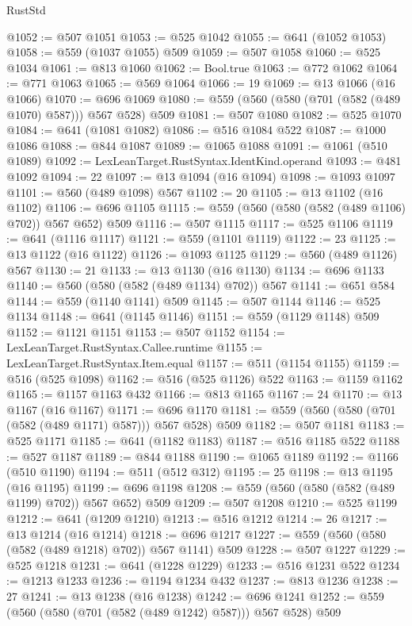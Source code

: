 \begin{lexlean}{RustStd}
\begin{coremodule}
@1052 := @507 @1051
@1053 := @525 @1042
@1055 := @641 (@1052 @1053)
@1058 := @559 (@1037 @1055) @509
@1059 := @507 @1058
@1060 := @525 @1034
@1061 := @813 @1060
@1062 := Bool.true
@1063 := @772 @1062
@1064 := @771 @1063
@1065 := @569 @1064
@1066 := 19
@1069 := @13 @1066 (@16 @1066)
@1070 := @696 @1069
@1080 := @559 (@560 (@580 (@701 (@582 (@489 @1070) @587))) @567 @528) @509
@1081 := @507 @1080
@1082 := @525 @1070
@1084 := @641 (@1081 @1082)
@1086 := @516 @1084 @522
@1087 := @1000 @1086
@1088 := @844 @1087
@1089 := @1065 @1088
@1091 := @1061 (@510 @1089)
@1092 := LexLeanTarget.RustSyntax.IdentKind.operand
@1093 := @481 @1092
@1094 := 22
@1097 := @13 @1094 (@16 @1094)
@1098 := @1093 @1097
@1101 := @560 (@489 @1098) @567
@1102 := 20
@1105 := @13 @1102 (@16 @1102)
@1106 := @696 @1105
@1115 := @559 (@560 (@580 (@582 (@489 @1106) @702)) @567 @652) @509
@1116 := @507 @1115
@1117 := @525 @1106
@1119 := @641 (@1116 @1117)
@1121 := @559 (@1101 @1119)
@1122 := 23
@1125 := @13 @1122 (@16 @1122)
@1126 := @1093 @1125
@1129 := @560 (@489 @1126) @567
@1130 := 21
@1133 := @13 @1130 (@16 @1130)
@1134 := @696 @1133
@1140 := @560 (@580 (@582 (@489 @1134) @702)) @567
@1141 := @651 @584
@1144 := @559 (@1140 @1141) @509
@1145 := @507 @1144
@1146 := @525 @1134
@1148 := @641 (@1145 @1146)
@1151 := @559 (@1129 @1148) @509
@1152 := @1121 @1151
@1153 := @507 @1152
@1154 := LexLeanTarget.RustSyntax.Callee.runtime
@1155 := LexLeanTarget.RustSyntax.Item.equal
@1157 := @511 (@1154 @1155)
@1159 := @516 (@525 @1098)
@1162 := @516 (@525 @1126) @522
@1163 := @1159 @1162
@1165 := @1157 @1163 @432
@1166 := @813 @1165
@1167 := 24
@1170 := @13 @1167 (@16 @1167)
@1171 := @696 @1170
@1181 := @559 (@560 (@580 (@701 (@582 (@489 @1171) @587))) @567 @528) @509
@1182 := @507 @1181
@1183 := @525 @1171
@1185 := @641 (@1182 @1183)
@1187 := @516 @1185 @522
@1188 := @527 @1187
@1189 := @844 @1188
@1190 := @1065 @1189
@1192 := @1166 (@510 @1190)
@1194 := @511 (@512 @312)
@1195 := 25
@1198 := @13 @1195 (@16 @1195)
@1199 := @696 @1198
@1208 := @559 (@560 (@580 (@582 (@489 @1199) @702)) @567 @652) @509
@1209 := @507 @1208
@1210 := @525 @1199
@1212 := @641 (@1209 @1210)
@1213 := @516 @1212
@1214 := 26
@1217 := @13 @1214 (@16 @1214)
@1218 := @696 @1217
@1227 := @559 (@560 (@580 (@582 (@489 @1218) @702)) @567 @1141) @509
@1228 := @507 @1227
@1229 := @525 @1218
@1231 := @641 (@1228 @1229)
@1233 := @516 @1231 @522
@1234 := @1213 @1233
@1236 := @1194 @1234 @432
@1237 := @813 @1236
@1238 := 27
@1241 := @13 @1238 (@16 @1238)
@1242 := @696 @1241
@1252 := @559 (@560 (@580 (@701 (@582 (@489 @1242) @587))) @567 @528) @509

\end{coremodule}
\end{lexlean}
